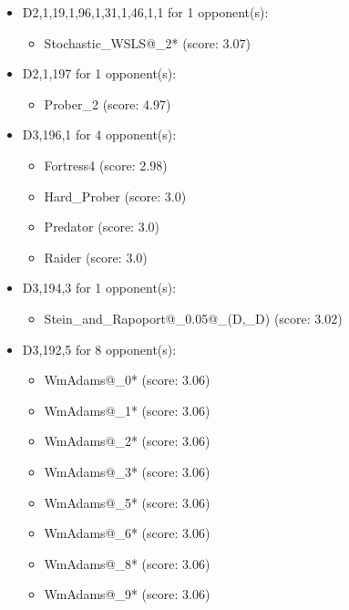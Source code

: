 \begin{appendices}
\begin{itemize}
    \item D2,1,19,1,96,1,31,1,46,1,1 for 1 opponent(s):
    \begin{multicols}{3}
         \begin{itemize}
            \item Stochastic\_WSLS@\_2* (score: 3.07)
        \end{itemize}
     \end{multicols}
     
    \item D2,1,197 for 1 opponent(s):
    \begin{multicols}{3}
         \begin{itemize}
            \item Prober\_2 (score: 4.97)
        \end{itemize}
     \end{multicols}
     
    \item D3,196,1 for 4 opponent(s):
    \begin{multicols}{3}
         \begin{itemize}
            \item Fortress4 (score: 2.98)
            \item Hard\_Prober (score: 3.0)
            \item Predator (score: 3.0)
            \item Raider (score: 3.0)
        \end{itemize}
     \end{multicols}
     
    \item D3,194,3 for 1 opponent(s):
    \begin{multicols}{3}
         \begin{itemize}
            \item Stein\_and\_Rapoport@\_0.05@\_(D,\_D) (score: 3.02)
        \end{itemize}
     \end{multicols}
     
    \item D3,192,5 for 8 opponent(s):
    \begin{multicols}{3}
         \begin{itemize}
            \item WmAdams@\_0* (score: 3.06)
            \item WmAdams@\_1* (score: 3.06)
            \item WmAdams@\_2* (score: 3.06)
            \item WmAdams@\_3* (score: 3.06)
            \item WmAdams@\_5* (score: 3.06)
            \item WmAdams@\_6* (score: 3.06)
            \item WmAdams@\_8* (score: 3.06)
            \item WmAdams@\_9* (score: 3.06)
        \end{itemize}
     \end{multicols}
     

\end{itemize}
\end{appendices}
